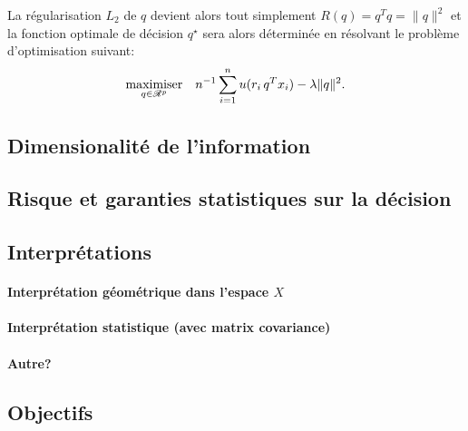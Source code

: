 La régularisation $L_2$ de $q$ devient alors tout simplement $R(q) = q^Tq = \|q\|^2$ et la
fonction optimale de décision $q^\star$ sera alors déterminée en résolvant le problème
d'optimisation suivant:
\begin{equation}
  \maximizeEquation[q \in \Re^p]{n^{-1}\sumi u(r_i\,q^Tx_i) - \lambda \|q\|^2.}
\end{equation}



\subsection{Dimensionalité de l'information}




\subsection{Risque et garanties statistiques sur la décision}



\subsection{Interprétations}

\paragraph{Interprétation géométrique dans l'espace $X$}

\paragraph{Interprétation statistique (avec matrix covariance)}

\par\paragraph{Autre?}



\subsection{Objectifs}






